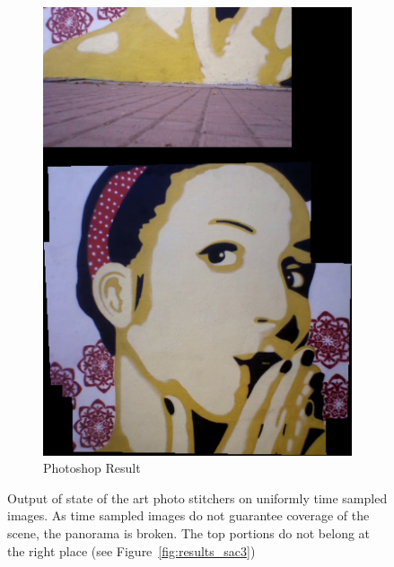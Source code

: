 \begin{figure}[t!]
\begin{subfigure}[b]{0.4\textwidth}
\includegraphics[width=\linewidth]{figures/sac3/uniform_sampled/photoshop.jpg}
\caption{Photoshop Result}
\end{subfigure}
\caption{Output of state of the art photo stitchers on uniformly time
  sampled images. As time sampled images do not guarantee 
  coverage of the scene, the panorama is broken. The top portions do
  not belong at the right place (see Figure~\ref{fig:results_sac3})}
\label{fig:results_sac3_timesmapled}
\end{figure}


